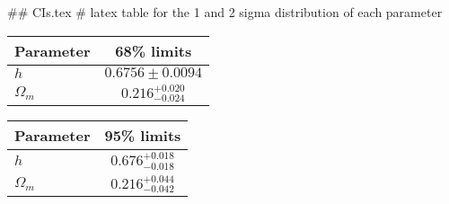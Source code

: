 ## CIs.tex
# latex table for the 1 and 2 sigma distribution of each parameter

\begin{tabular} { l  c}
 Parameter &  68\% limits\\
\hline
{\boldmath$h              $} & $0.6756\pm 0.0094          $\\
{\boldmath$\Omega_m       $} & $0.216^{+0.020}_{-0.024}   $\\
\hline
\end{tabular}

\begin{tabular} { l  c}
 Parameter &  95\% limits\\
\hline
{\boldmath$h              $} & $0.676^{+0.018}_{-0.018}   $\\
{\boldmath$\Omega_m       $} & $0.216^{+0.044}_{-0.042}   $\\
\hline
\end{tabular}

